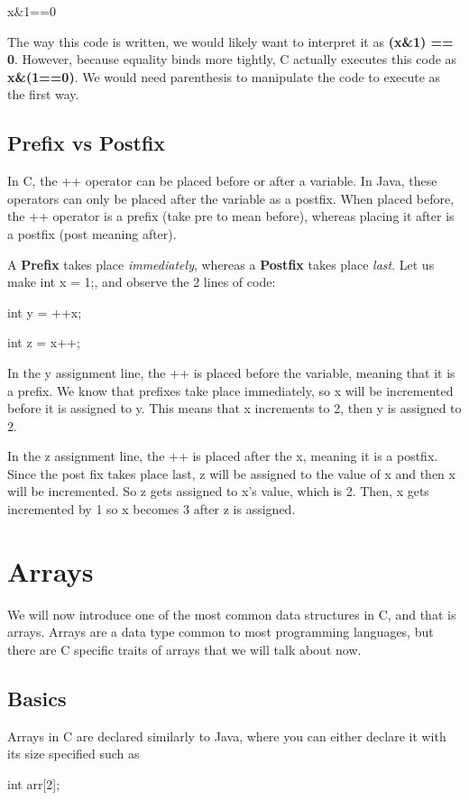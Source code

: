\documentclass[letterpaper]{article}
\theoremstyle{remark}
\begin{document}
\huge{x\&1==0}

\normalsize{The way this code is written, we would likely want to interpret it as \textbf{(x\&1) == 0}}. However, because equality binds more tightly, C actually executes this code as \textbf{x\&(1==0)}. We would need parenthesis to manipulate the code to execute as the first way.

\subsection{Prefix vs Postfix}
In C, the ++ operator can be placed before or after a variable. In Java, these operators can only be placed after the variable as a postfix. When placed before, the ++ operator is a prefix (take pre to mean before), whereas placing it after is a postfix (post meaning after).

A \textbf{Prefix} takes place \textit{immediately}, whereas a \textbf{Postfix} takes place \textit{last}. Let us make int x = 1;, and observe the 2 lines of code:

int y = ++x;

int z = x++;

In the y assignment line, the ++ is placed before the variable, meaning that it is a prefix. We know that prefixes take place immediately, so x will be incremented before it is assigned to y. This means that x increments to 2, then y is assigned to 2.

In the z assignment line, the ++ is placed after the x, meaning it is a postfix. Since the post fix takes place last, z will be assigned to the value of x and then x will be incremented. So z gets assigned to x's value, which is 2. Then, x gets incremented by 1 so x becomes 3 after z is assigned.

\section{Arrays}
We will now introduce one of the most common data structures in C, and that is arrays. Arrays are a data type common to most programming languages, but there are C specific traits of arrays that we will talk about now.

\subsection{Basics}
Arrays in C are declared similarly to Java, where you can either declare it with its size specified such as 

int arr[2];
\end{document}
